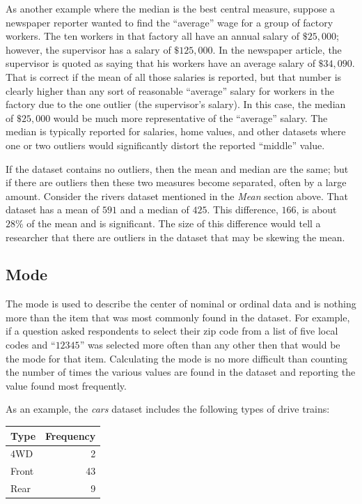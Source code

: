 As another example where the median is the best central measure, suppose a newspaper reporter wanted to find the ``average'' wage for a group of factory workers. The ten workers in that factory all have an annual salary of $ \$25,000 $; however, the supervisor has a salary of $ \$125,000 $. In the newspaper article, the supervisor is quoted as saying that his workers have an average salary of $ \$34,090 $. That is correct if the mean of all those salaries is reported, but that number is clearly higher than any sort of reasonable ``average'' salary for workers in the factory due to the one outlier (the supervisor's salary). In this case, the median of $ \$25,000 $ would be much more representative of the ``average'' salary. The median is typically reported for salaries, home values, and other datasets where one or two outliers would significantly distort the reported ``middle'' value.

If the dataset contains no outliers, then the mean and median are the same; but if there are outliers then these two measures become separated, often by a large amount. Consider the rivers dataset mentioned in the \textit{Mean} section above. That dataset has a mean of $ 591 $ and a median of $ 425 $. This difference, $ 166 $, is about $ 28\% $ of the mean and is significant. The size of this difference would tell a researcher that there are outliers in the dataset that may be skewing the mean.

\subsection{Mode}
The mode is used to describe the center of nominal or ordinal data and is nothing more than the item that was most commonly found in the dataset. For example, if a question asked respondents to select their zip code from a list of five local codes and ``$ 12345 $'' was selected more often than any other then that would be the mode for that item. Calculating the mode is no more difficult than counting the number of times the various values are found in the dataset and reporting the value found most frequently. 

As an example, the \textit{cars} dataset includes the following types of drive trains:

\begin{center}
  \begin{tabular}{lr}
    \hline 
    \textbf{Type} & \textbf{Frequency} \\ 
    \hline 
    $ 4 $WD & 2 \\ 
    Front & 43 \\ 
    Rear & 9 \\ 
    \hline 
  \end{tabular}
\end{center}

